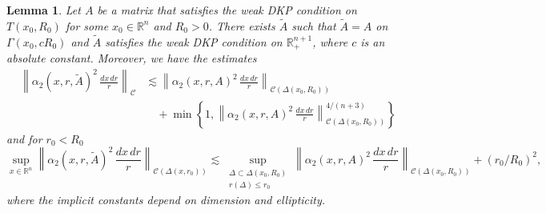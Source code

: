 \documentclass[11pt, a4paper,leqno]{amsart}
\theoremstyle{plain}
\newtheorem{lemma}[equation]{Lemma}
\theoremstyle{definition}
\theoremstyle{remark}
\numberwithin{equation}{section}
\newcommand{\rn}{\mathbb{R}^n}
\newcommand{\ree}{\mathbb{R}^{n+1}}
\begin{document}
\begin{lemma}\label{localizeDKP.lem}
Let $A$ be a matrix that satisfies the weak DKP condition on $T(x_0,R_0)$ for some $x_0 \in \rn$ and $R_0> 0$.  There exists $\widetilde{A}$ such that $\widetilde{A} = A$ on $\Gamma(x_0, cR_0)$ and $\widetilde{A}$ satisfies the weak DKP condition on $\ree_+$, where $c$ is an absolute constant. Moreover, we have the estimates
\begin{equation}\label{localdkplem1.eq}
\begin{split}
\left\| \alpha_2(x,r,\widetilde{A})^2 \, \frac{dx \, dr}{r}\right\|_{\mathcal{C}} &\lesssim \left\| \alpha_2(x,r,A)^2 \, \frac{dx \, dr}{r}\right\|_{\mathcal{C}(\Delta(x_0,R_0))}  
\\ & \quad + \min\left\{1, \left\| \alpha_2(x,r,A)^2 \, \frac{dx \, dr}{r}\right\|_{\mathcal{C}(\Delta(x_0,R_0))}^{4/(n+3)}  \right\} 
\end{split}
\end{equation}
and for $r_0 < R_0$
\begin{equation}\label{localdkplem2.eq}
\sup_{x \in \rn} \left\| \alpha_2(x,r,\widetilde{A})^2 \, \frac{dx \, dr}{r}\right\|_{\mathcal{C}(\Delta(x,r_0))} \lesssim \sup_{\substack{\Delta \subset \Delta(x_0,R_0) \\ r(\Delta) \le r_0}}\left\| \alpha_2(x,r,A)^2 \, \frac{dx \, dr}{r}\right\|_{\mathcal{C}(\Delta(x_0,R_0))}  + (r_0/R_0)^2, 
\end{equation}
where the implicit constants depend on dimension and ellipticity. 
\end{lemma}
\end{document}
